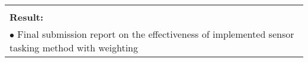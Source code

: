 \begin{table}[!h]
\begin{center}
\begin{tabular}{|p{35mm}||p{55mm}|p{50mm}||p{40mm}|}
      \multicolumn{4}{|p{150mm}|}{}                                                                                                                                                                           \\
      \multicolumn{4}{|p{150mm}|}{\textbf{Result:}}                                                                                                                                                       \\
      \multicolumn{4}{|p{150mm}|}{$\bullet$ Final submission report on the effectiveness of implemented sensor tasking method with weighting}                                                                                                                          \\
      \hline
    \end{tabular}
  \end{center}
\end{table}

\clearpage